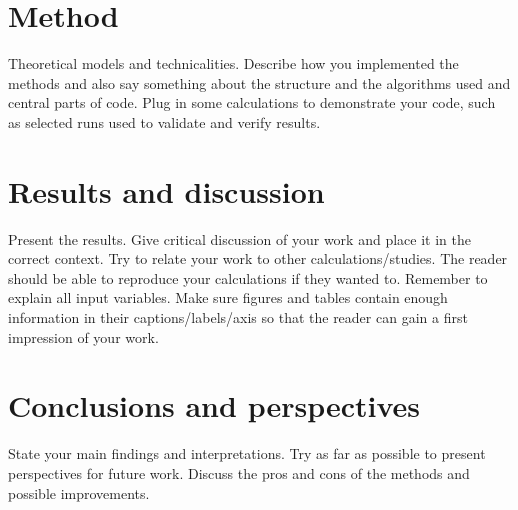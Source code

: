 \documentclass[english, a4paper]{report}
\begin{document}
\section{Method}
Theoretical models and technicalities. Describe how you implemented the methods and also say something about the structure and the algorithms used and central parts of code. Plug in some calculations to demonstrate your code, such as selected runs used to validate and verify results.




\section{Results and discussion}
Present the results. Give critical discussion of your work and place it in the correct context. Try to relate your work to other calculations/studies. The reader should be able to reproduce your calculations if they wanted to. Remember to explain all input variables. Make sure figures and tables contain enough information in their captions/labels/axis so that the reader can gain a first impression of your work.




\section{Conclusions and perspectives}
State your main findings and interpretations. Try as far as possible to present perspectives for future work. Discuss the pros and cons of the methods and possible improvements.
\cite{russellArtificialIntelligenceModern2016}


\newpage


\end{document}
